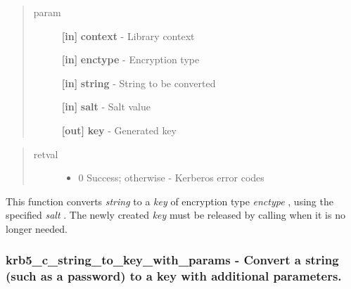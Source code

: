 \documentclass[letterpaper,10pt,english]{sphinxmanual}
\begin{document}
\begin{quote}\begin{description}
\item[{param}] \leavevmode
\textbf{{[}in{]}} \textbf{context} - Library context

\textbf{{[}in{]}} \textbf{enctype} - Encryption type

\textbf{{[}in{]}} \textbf{string} - String to be converted

\textbf{{[}in{]}} \textbf{salt} - Salt value

\textbf{{[}out{]}} \textbf{key} - Generated key

\end{description}\end{quote}
\begin{quote}\begin{description}
\item[{retval}] \leavevmode\begin{itemize}
\item {} 
0   Success; otherwise - Kerberos error codes

\end{itemize}

\end{description}\end{quote}

This function converts \emph{string} to a \emph{key} of encryption type \emph{enctype} , using the specified \emph{salt} . The newly created \emph{key} must be released by calling {\hyperref[appdev/refs/api/krb5_free_keyblock_contents:krb5_free_keyblock_contents]{}} when it is no longer needed.


\subsubsection{krb5\_c\_string\_to\_key\_with\_params -  Convert a string (such as a password) to a key with additional parameters.}
\label{appdev/refs/api/krb5_c_string_to_key_with_params::doc}\label{appdev/refs/api/krb5_c_string_to_key_with_params:krb5-c-string-to-key-with-params-convert-a-string-such-as-a-password-to-a-key-with-additional-parameters}

\begin{fulllineitems}
\label{appdev/refs/api/krb5_c_string_to_key_with_params:krb5_c_string_to_key_with_params}
\end{fulllineitems}
\end{document}
